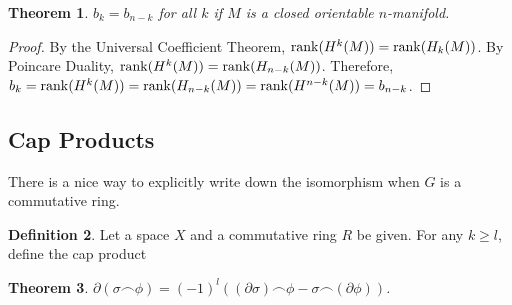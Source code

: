 \documentclass[psamsfonts]{amsart}
\newtheorem{thm}{Theorem}[section]
\theoremstyle{definition}
\newtheorem{defn}[thm]{Definition}
\theoremstyle{rem}
\numberwithin{equation}{section}
\begin{document}
\begin{thm}
  $b_k = b_{n - k}$ for all $k$ if $M$ is a closed orientable $n$-manifold.
\end{thm}

\begin{proof}
  By the Universal Coefficient Theorem, $\rank(H^k(M)) = \rank(H_k(M))$.
  By Poincare Duality, $\rank(H^k(M)) = \rank(H_{n - k}(M))$.
  Therefore, $b_k = \rank(H^k(M)) = \rank(H_{n - k}(M)) = \rank(H^{n - k}(M)) = b_{n - k}$.
\end{proof}

\subsection{Cap Products}
There is a nice way to explicitly write down the isomorphism when $G$ is a commutative ring.

\begin{defn}
  Let a space $X$ and a commutative ring $R$ be given.
  For any $k \geq l$, define the cap product
  \begin{center}
  \end{center}
\end{defn}

\begin{thm}\label{cap_product_formula}
  $\partial (\sigma \frown \phi) = (-1)^l((\partial \sigma) \frown \phi - \sigma \frown (\partial \phi))$.
\end{thm}
\end{document}

